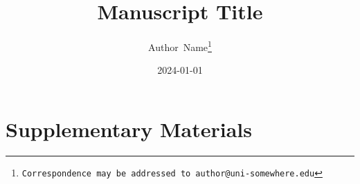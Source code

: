 \documentclass{article}
\title{Manuscript Title}
\date{2024-01-01}
\author[1]{{\href{https://orcid.org/0000-0000-0000-0000}{\usebox{\orcid}\hspace{1mm}}Author~Name\thanks{\texttt{Correspondence may be addressed to author@uni-somewhere.edu}}}}
\affil[1]{Department of Something, University of Somewhere, City, Country}
\begin{document}
\maketitle

\begin{abstract}
    
\end{abstract}










\renewcommand{\thefigure}{S\arabic{figure}}
\setcounter{figure}{0}

\section*{Supplementary Materials}

\end{document}
